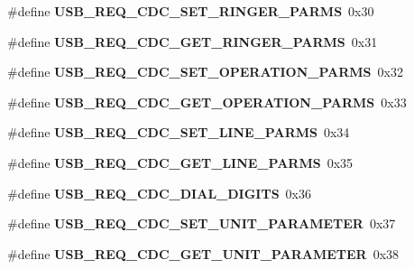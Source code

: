 \begin{DoxyCompactItemize}
\#define {\bfseries U\+S\+B\+\_\+\+R\+E\+Q\+\_\+\+C\+D\+C\+\_\+\+S\+E\+T\+\_\+\+R\+I\+N\+G\+E\+R\+\_\+\+P\+A\+R\+MS}~0x30
\item 
\mbox{\label{group__cdc__protocol__group_gafb80f6a095d4508e211ed5e775b2c500}} 
\#define {\bfseries U\+S\+B\+\_\+\+R\+E\+Q\+\_\+\+C\+D\+C\+\_\+\+G\+E\+T\+\_\+\+R\+I\+N\+G\+E\+R\+\_\+\+P\+A\+R\+MS}~0x31
\item 
\mbox{\label{group__cdc__protocol__group_gad3375aed1f7a5e7df4685126d66f09b6}} 
\#define {\bfseries U\+S\+B\+\_\+\+R\+E\+Q\+\_\+\+C\+D\+C\+\_\+\+S\+E\+T\+\_\+\+O\+P\+E\+R\+A\+T\+I\+O\+N\+\_\+\+P\+A\+R\+MS}~0x32
\item 
\mbox{\label{group__cdc__protocol__group_ga69f047ea3ec9e3a356ff005a81a6dbad}} 
\#define {\bfseries U\+S\+B\+\_\+\+R\+E\+Q\+\_\+\+C\+D\+C\+\_\+\+G\+E\+T\+\_\+\+O\+P\+E\+R\+A\+T\+I\+O\+N\+\_\+\+P\+A\+R\+MS}~0x33
\item 
\mbox{\label{group__cdc__protocol__group_ga3683e27c05ec1d65d1a22a014b665792}} 
\#define {\bfseries U\+S\+B\+\_\+\+R\+E\+Q\+\_\+\+C\+D\+C\+\_\+\+S\+E\+T\+\_\+\+L\+I\+N\+E\+\_\+\+P\+A\+R\+MS}~0x34
\item 
\mbox{\label{group__cdc__protocol__group_gafe2f2f77e0f6fa768d3fae25131ef7fb}} 
\#define {\bfseries U\+S\+B\+\_\+\+R\+E\+Q\+\_\+\+C\+D\+C\+\_\+\+G\+E\+T\+\_\+\+L\+I\+N\+E\+\_\+\+P\+A\+R\+MS}~0x35
\item 
\mbox{\label{group__cdc__protocol__group_ga68985a9191870bd17d55657d413a17da}} 
\#define {\bfseries U\+S\+B\+\_\+\+R\+E\+Q\+\_\+\+C\+D\+C\+\_\+\+D\+I\+A\+L\+\_\+\+D\+I\+G\+I\+TS}~0x36
\item 
\mbox{\label{group__cdc__protocol__group_gaa9d1d583e759b94bec18d8ae2c5b830c}} 
\#define {\bfseries U\+S\+B\+\_\+\+R\+E\+Q\+\_\+\+C\+D\+C\+\_\+\+S\+E\+T\+\_\+\+U\+N\+I\+T\+\_\+\+P\+A\+R\+A\+M\+E\+T\+ER}~0x37
\item 
\mbox{\label{group__cdc__protocol__group_gaa1dbd05f95ee9fa9b0a18c3baaf70510}} 
\#define {\bfseries U\+S\+B\+\_\+\+R\+E\+Q\+\_\+\+C\+D\+C\+\_\+\+G\+E\+T\+\_\+\+U\+N\+I\+T\+\_\+\+P\+A\+R\+A\+M\+E\+T\+ER}~0x38

\end{DoxyCompactItemize}
